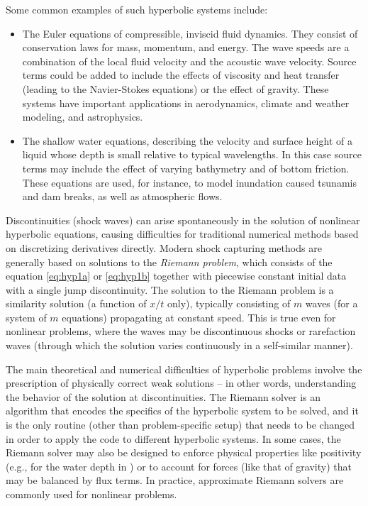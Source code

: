 Some common examples of such hyperbolic systems include:
\begin{itemize}
    \item The Euler equations of compressible, inviscid fluid dynamics.
        They consist of conservation laws for mass, momentum, and energy.
        The wave speeds are a combination of the local fluid velocity
        and the acoustic wave velocity.  Source terms could be added
        to include the effects of viscosity and heat transfer
        (leading to the Navier-Stokes equations) or the effect of gravity.
        These systems have important applications in
        aerodynamics, climate and weather modeling, and astrophysics.
    \item The shallow water equations, describing the velocity and
        surface height of a liquid whose depth is small relative to
        typical wavelengths.  In this case source terms may include
        the effect of varying bathymetry and of bottom friction.
        These equations are used, for instance, to model inundation
        caused tsunamis and dam breaks, as well as atmospheric flows.
\end{itemize}

Discontinuities (shock waves) can arise spontaneously in the solution of nonlinear
hyperbolic equations, causing difficulties for
traditional numerical methods based on discretizing derivatives
directly.   Modern shock capturing methods are generally based on solutions
to the {\em Riemann problem}, which consists of the equation
\cref{eq:hyp1a} or \cref{eq:hyp1b}
together with piecewise constant initial data with a single jump discontinuity.
The solution to the Riemann problem is a similarity
solution (a function of $x/t$ only),
typically consisting of $m$ waves (for a system of $m$ equations)
propagating at constant speed.  This is true even for nonlinear problems,
where the waves may be discontinuous shocks or rarefaction waves
(through which the solution varies continuously in a self-similar manner).

The main theoretical
and numerical difficulties of hyperbolic problems involve the prescription of
physically correct weak solutions -- in other words, understanding the behavior
of the solution at discontinuities.  The Riemann solver is an algorithm that
encodes the specifics of the hyperbolic system to be solved, and it is the only
routine (other than problem-specific setup) that needs to be changed in order
to apply the code to different hyperbolic systems.  In some cases, the Riemann
solver may also be designed to enforce physical properties like positivity
(e.g., for the water depth in \geoclaw) or to account for forces (like that
of gravity) that may be balanced by flux terms.
In practice, approximate Riemann solvers are commonly used for nonlinear
problems.%

